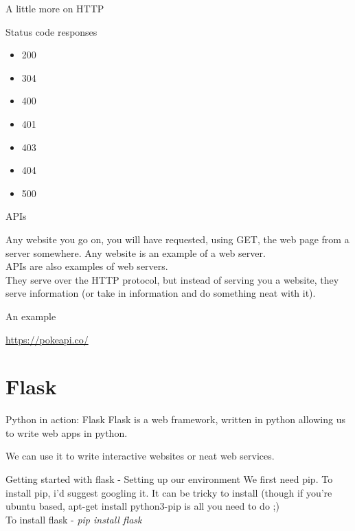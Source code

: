 \documentclass{beamer}
\begin{document}
\begin{frame}{A little more on HTTP}

\pause
Status code responses\pause
\begin{itemize}
  \item 200\pause
  \item 304\pause
  \item 400\pause
  \item 401\pause
  \item 403\pause
  \item 404\pause
  \item 500
  \end{itemize}

\end{frame}


\begin{frame}{APIs}

Any website you go on, you will have requested, using GET, the web page from a server somewhere. Any website is an example of a web server.\\ \pause
APIs are also examples of web servers.\\ \pause
They serve over the HTTP protocol, but instead of serving you a website, they serve information (or take in information and do something neat with it).

\end{frame}

\begin{frame}{An example}

\url{https://pokeapi.co/}

\end{frame}



\section{Flask}

\begin{frame}{Python in action: Flask}
Flask is a web framework, written in python allowing us to write web apps in python.\\ \pause

We can use it to write interactive websites or neat web services.
\end{frame}


\begin{frame}{Getting started with flask - Setting up our environment}
We first need pip. To install pip, i'd suggest googling it. It can be tricky to install (though if you're ubuntu based, apt-get install python3-pip is all you need to do ;)\\ \pause
To install flask - \textit{pip install flask}

\end{frame}
\end{document}

